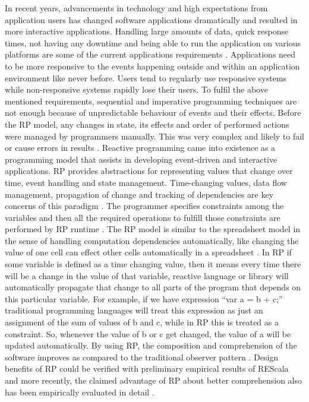 In recent years, advancements in technology and high expectations from application users has changed software applications dramatically and resulted in more interactive applications.
Handling large amounts of data, quick response times, not having any downtime and being able to run the application on various platforms are some of the current applications requirements \cite{reactiveManifesto}. Applications need to be more responsive to the events happening outside and within an application environment like never before. Users tend to regularly use responsive systems while non-responsive systems rapidly lose their users. To fulfil the above mentioned requirements, sequential and imperative programming techniques are not enough because of unpredictable behaviour of events and their effects. Before the RP model, any changes in state, its effects and order of performed actions were managed by programmers manually. This was very complex and likely to fail or cause errors in results \cite{Edwards:2009:CR:1639950.1640058}.
Reactive programming came into existence as a programming model that assists in developing event-driven and interactive applications. RP provides abstractions for representing values that change over time, event handling and state management. Time-changing values, data flow management, propagation of change and tracking of dependencies are key concerns of this paradigm \cite{Margara:2014:WDD:2611286.2611290}. The programmer specifies constraints among the variables and then all the required operations to fulfill those constraints are performed by RP runtime \cite{6840828}. The RP model is similar to the spreadsheet model in the sense of handling computation dependencies automatically, like changing the value of one cell can effect other cells automatically in a spreadsheet \cite{Bainomugisha:2013:SRP:2501654.2501666}. In RP if some variable is defined as a time changing value, then it means every time there will be a change in the value of that variable, reactive language or library will automatically propagate that change to all parts of the program that depends on this particular variable.
For example, if we have expression ``var a = b + c;'' traditional programming languages will treat this expression as just an assignment of the sum of values of b and c, while in RP this is treated as a constraint. So, whenever the value of b or c get changed, the value of a will be updated automatically.
By using RP, the composition and comprehension of the software improves as compared to the traditional observer
pattern \cite{Meyerovich:2009:FPL:1639949.1640091,Bainomugisha:2013:SRP:2501654.2501666,EPFL-REPORT-176887}. Design benefits of RP could be verified with preliminary empirical results of REScala and more recently, the claimed advantage of RP about better comprehension also has been empirically evaluated in detail \cite{7827078}.
